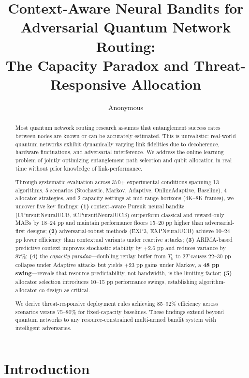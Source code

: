 \documentclass[sigconf,anonymous]{acmart}
\title{Context-Aware Neural Bandits for Adversarial Quantum Network Routing: \\
The Capacity Paradox and Threat-Responsive Allocation}
\author{Anonymous}
\affiliation{%
  \institution{Anonymous Institution}
  \city{Anonymous City}
  \country{Anonymous Country}}
\newcommand{\Tb}{T_{\text{b}}}
\newcommand{\TwoT}{2T}
\begin{document}
\maketitle

\begin{abstract}

Most quantum network routing research assumes that entanglement success rates between nodes are known or can be accurately estimated. This is unrealistic: real-world quantum networks exhibit dynamically varying link fidelities due to decoherence, hardware fluctuations, and adversarial interference. We address the online learning problem of jointly optimizing entanglement path selection and qubit allocation in real time without prior knowledge of link-performance.

Through systematic evaluation across 370+ experimental conditions spanning 13 algorithms, 5 scenarios (Stochastic, Markov, Adaptive, OnlineAdaptive, Baseline), 4 allocator strategies, and 2 capacity settings at mid-range horizons (4K--8K frames), we uncover five key findings: \textbf{(1)} context-aware Pursuit neural bandits (CPursuitNeuralUCB, iCPursuitNeuralUCB) outperform classical and reward-only MABs by 18--24 pp and maintain performance floors 15--20 pp higher than adversarial-first designs; \textbf{(2)} adversarial-robust methods (EXP3, EXPNeuralUCB) achieve 10--24 pp lower efficiency than contextual variants under reactive attacks; \textbf{(3)} ARIMA-based predictive context improves stochastic stability by +2.6 pp and reduces variance by 87\%; \textbf{(4)} the \emph{capacity paradox}—doubling replay buffer from $\Tb$ to $\TwoT$ causes 22--30 pp collapse under Adaptive attacks but yields +23 pp gains under Markov, a \textbf{48 pp swing}—reveals that resource predictability, not bandwidth, is the limiting factor; \textbf{(5)} allocator selection introduces 10--15 pp performance swings, establishing algorithm-allocator co-design as critical.

We derive threat-responsive deployment rules achieving 85--92\% efficiency across scenarios versus 75--80\% for fixed-capacity baselines. These findings extend beyond quantum networks to any resource-constrained multi-armed bandit system with intelligent adversaries.

\end{abstract}

\section{Introduction}
\label{sec:introduction}
\end{document}
